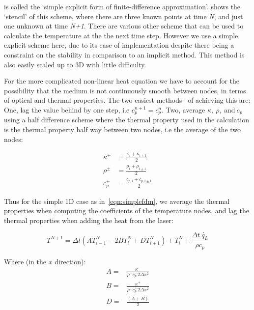  is called the `simple explicit form of finite-difference approximation'\cite{ozisik1994finite}.  shows the `stencil' of this scheme, where there are three known points at time \textit{N}, and just one unknown at time \textit{N+1}. There are various other scheme that can be used to calculate the temperature at the the next time step. However we use a simple explicit scheme here, due to its ease of implementation despite there being a constraint on the stability in comparison to an implicit method. This method is also easily scaled up to 3D with little difficulty.

\medskip

For the more complicated non-linear heat equation we have to account for the possibility that the medium is not continuously smooth between nodes, in terms of optical and thermal properties. The two easiest methods~\cite{ozisik1994finite} of achieving this are: One, lag the value behind by one step, i.e $c_{p}^{n+1}=c_{p}^{n}$. Two, average $\kappa,\ \rho,\ \text{and}\ c_p$ using a half difference scheme where the thermal property used in the calculation is the thermal property half way between two nodes, i.e the average of the two nodes:

\begin{align}
\kappa^{\pm}&=\frac{\kappa_i+\kappa_{i\pm 1}}{2}\\
\rho^{\pm}&=\frac{\rho_i+\rho_{i\pm 1}}{2}\\
c_p^{\pm}&=\frac{c_{p,i}+c_{p,i\pm 1}}{2}
\end{align}

Thus for the simple 1D case as in~\cref{eqn:simplefdm}, we average the thermal properties when computing the coefficients of the temperature nodes, and lag the thermal properties when adding the heat from the laser:

\begin{equation}
T^{N+1}=\Delta t (AT^N_{i-1}-2BT^N_{i}+DT^N_{i+1})+ T_i^N + \frac{\Delta t\ \dot{q_L}}{\rho c_p}\label{eqn:heatnonlin1d}
\end{equation}

Where (in the $x$ direction):
\begin{align}
A=&\frac{\kappa^{-}}{\rho^{-}c_{p}^{-}2\Delta x^2} \nonumber \\
B=&\frac{\kappa^{+}}{\rho^{+}c_{p}^{+}2\Delta x^2} \label{eqn:coeffsABD}\\
D=&\frac{(A+B)}{2} \nonumber
\end{align}

